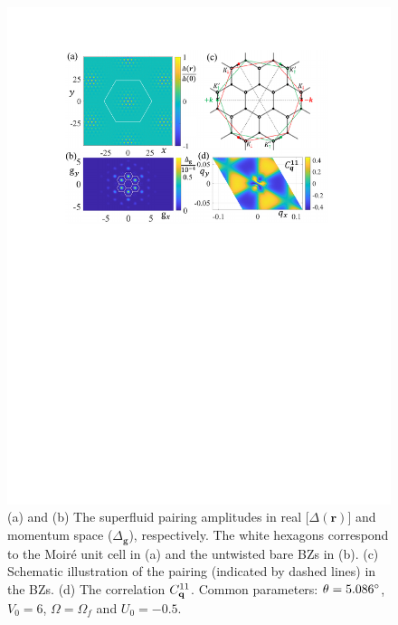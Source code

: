 \documentclass[twocolumn,english,prl,floatfix,citeautoscript,nofootinbib]{revtex4}
\begin{document}
\begin{figure}[tb]
\includegraphics[width=1.0\linewidth]{Fig4_rr.pdf}
\caption{(a) and (b) The superfluid pairing amplitudes in real [$\Delta (%
\mathbf{r})$] and momentum space ($\Delta _{\mathbf{g}}$), respectively. The
white hexagons correspond to the Moir\'{e} unit cell in (a) and the
untwisted bare BZs in (b). (c) Schematic illustration of the pairing
(indicated by dashed lines) in the BZs. (d) The correlation $C_{%
\mathbf{q}}^{11}$. Common parameters: $\protect\theta =5.086^{\circ }$, $%
V_{0}=6$, $\Omega =\Omega _{f}$ and $U_{0}=-0.5$.}
\label{fig:order}
\end{figure}
\end{document}

